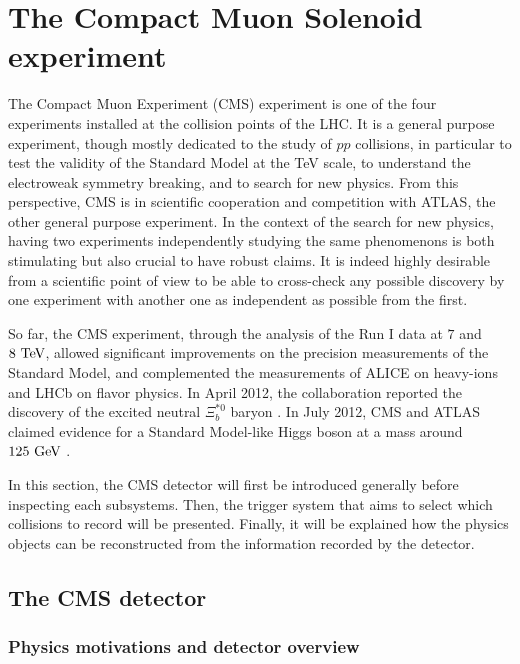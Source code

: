     \section{The Compact Muon Solenoid experiment}

        The Compact Muon Experiment (CMS) experiment is one of the four experiments installed
        at the collision points of the LHC. It is a general purpose experiment, though mostly dedicated
        to the study of $pp$ collisions, in particular to test the validity of the Standard
        Model at the TeV scale, to understand the electroweak symmetry breaking, and to search for new physics. From this
        perspective, CMS is in scientific cooperation and competition with ATLAS, the
        other general purpose experiment. In the context of the search for new physics,
        having two experiments independently studying the same phenomenons is both
        stimulating but also crucial to have robust claims. It is indeed highly desirable
        from a scientific point of view to be able to cross-check any possible discovery
        by one experiment with another one as independent as possible from the first.

        So far, the CMS experiment, through the analysis of the Run I data at
        $7$ and $8~\text{TeV}$, allowed significant improvements on the precision measurements
        of the Standard Model, and complemented the measurements of ALICE on heavy-ions
        and LHCb on flavor physics. In April 2012, the collaboration reported the discovery
        of the excited neutral $\Xi^{*0}_b$ baryon \cite{XibBaryon}.
        In July 2012, CMS and ATLAS claimed evidence for a Standard Model-like Higgs boson
        at a mass around $125~\text{GeV}$ \cite{CMSHiggs}.

        In this section, the CMS detector will first be introduced generally before inspecting
        each subsystems. Then, the trigger system that aims to select which collisions to
        record will be presented. Finally, it will be explained how the physics objects
        can be reconstructed from the information recorded by the detector.

        \subsection{The CMS detector}

            \subsubsection{Physics motivations and detector overview}

